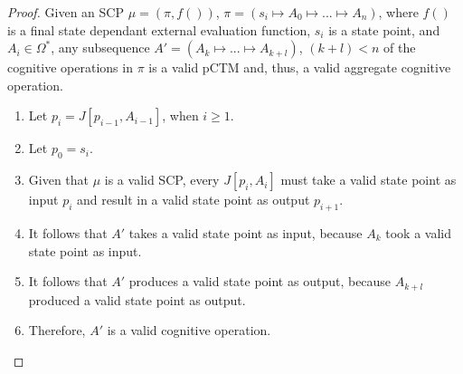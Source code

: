 \begin{proof} \label{proof:aggregateValid}
Given an SCP $\mu=(\pi,f())$, $\pi= (s_i \longmapsto A_0 \longmapsto ... \longmapsto A_n)$, where $f()$ is a final state dependant external evaluation function, $s_i$ is a state point, and $A_i \in \Omega^*$, any subsequence $A'=(A_k \longmapsto ... \longmapsto A_{k+l})$, $(k+l)<n$ of the cognitive operations in $\pi$ is a valid pCTM and, thus, a valid aggregate cognitive operation.
\begin{enumerate}
\item Let $p_i=J[p_{i-1},A_{i-1}]$, when $i\geq 1$.
\item Let $p_0=s_i$.
\item Given that $\mu$ is a valid SCP, every $J[p_i,A_i]$ must take a valid state point as input $p_i$ and result in a valid state point as output $p_{i+1}$.
\item It follows that $A'$ takes a valid state point as input, because $A_k$ took a valid state point as input.
\item It follows that $A'$ produces a valid state point as output, because $A_{k+l}$ produced a valid state point as output.
\item Therefore, $A'$ is a valid cognitive operation.
\end{enumerate}
\end{proof}


